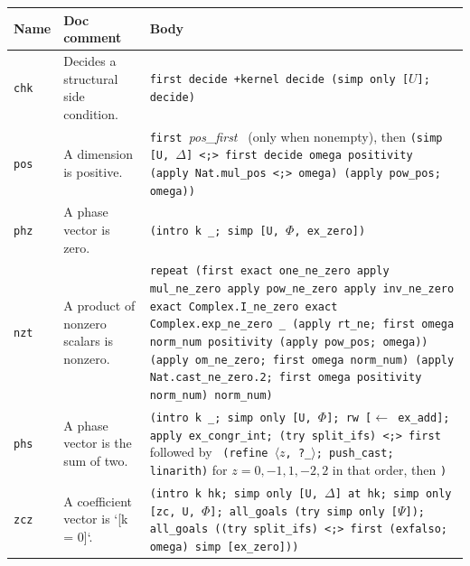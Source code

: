 {\begin{xltabular}{\linewidth}{@{}p{1.1cm}p{3.2cm}X@{}}
\toprule
Name & Doc comment & Body \\
\midrule
\texttt{chk} & Decides a structural side condition. &
  \texttt{first \textbar{} decide +kernel \textbar{} decide \textbar{} (simp only [}$U$\texttt{]; decide)} \\
\texttt{pos} & A dimension is positive. &
  \texttt{first \textbar{} }\textit{pos\_first}\texttt{ \textbar{} } (only when nonempty), then
  \texttt{(simp [U, $\Delta$] \textless{};\textgreater{} first \textbar{} decide \textbar{} omega \textbar{} positivity \textbar{} (apply Nat.mul\_\allowbreak{}pos \textless{};\textgreater{} omega) \textbar{} (apply pow\_\allowbreak{}pos; omega))} \\
\texttt{phz} & A phase vector is zero. & \texttt{(intro k \_\allowbreak{}; simp [U, $\Phi$, ex\_\allowbreak{}zero])} \\
\texttt{nzt} & A product of nonzero scalars is nonzero. &
  \texttt{repeat (first \textbar{} exact one\_\allowbreak{}ne\_\allowbreak{}zero \textbar{} apply mul\_\allowbreak{}ne\_\allowbreak{}zero \textbar{} apply pow\_\allowbreak{}ne\_\allowbreak{}zero \textbar{} apply inv\_\allowbreak{}ne\_\allowbreak{}zero \textbar{} exact Complex.I\_\allowbreak{}ne\_\allowbreak{}zero \textbar{} exact Complex.exp\_\allowbreak{}ne\_\allowbreak{}zero \_\allowbreak{} \textbar{} (apply rt\_\allowbreak{}ne; first \textbar{} omega \textbar{} norm\_\allowbreak{}num \textbar{} positivity \textbar{} (apply pow\_\allowbreak{}pos; omega)) \textbar{} (apply om\_\allowbreak{}ne\_\allowbreak{}zero; first \textbar{} omega \textbar{} norm\_\allowbreak{}num) \textbar{} (apply Nat.cast\_\allowbreak{}ne\_\allowbreak{}zero.2; first \textbar{} omega \textbar{} positivity \textbar{} norm\_\allowbreak{}num) \textbar{} norm\_\allowbreak{}num)} \\
\texttt{phs} & A phase vector is the sum of two. &
  \texttt{(intro k \_\allowbreak{}; simp only [U, $\Phi$]; rw [$\leftarrow$ ex\_\allowbreak{}add]; apply ex\_\allowbreak{}congr\_\allowbreak{}int; (try split\_\allowbreak{}ifs) \textless{};\textgreater{} first }
  followed by \texttt{\textbar{} (refine $\langle$}$z$\texttt{, ?\_\allowbreak{}$\rangle$; push\_\allowbreak{}cast; linarith)} for
  $z = 0, -1, 1, -2, 2$ in that order, then \texttt{)} \\
\texttt{zcz} & A coefficient vector is `[k = 0]`. &
  \texttt{(intro k hk; simp only [U, $\Delta$] at hk; simp only [zc, U, $\Phi$]; all\_\allowbreak{}goals (try simp only [$\Psi$]); all\_\allowbreak{}goals ((try split\_\allowbreak{}ifs) \textless{};\textgreater{} first \textbar{} (exfalso; omega) \textbar{} simp [ex\_\allowbreak{}zero]))} \\
\bottomrule
\end{xltabular}

}
